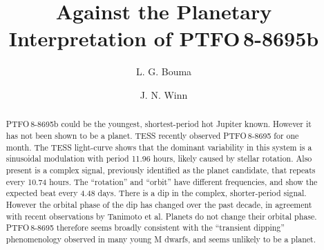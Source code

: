 \documentclass[12pt,twocolumn,tighten]{aastex62}
\begin{document}

\title{Against the Planetary Interpretation of PTFO$\,$8-8695b}


%
%
\author[0000-0002-0514-5538]{L. G. Bouma}
%
\author[0000-0002-4265-047X]{J. N. Winn}

%
%

\begin{abstract}
  PTFO$\,$8-8695b could be the youngest, shortest-period 
  hot Jupiter known.  However it has not been shown to be a planet.
  TESS recently observed PTFO$\,$8-8695 for one month.
  The TESS light-curve shows that the dominant variability in this
  system is a sinusoidal modulation with period 11.96 hours, likely
  caused by stellar rotation.
  Also present is a complex signal, previously identified as the
  planet candidate, that repeats every 10.74 hours.
  The ``rotation'' and ``orbit'' have different frequencies,
  and show the expected beat every 4.48 days.
  There is a dip in the complex, shorter-period signal.
  However the orbital phase of the dip has changed over the past
  decade, in agreement with recent observations by Tanimoto et al.
  Planets do not change their orbital phase.
  PTFO$\,$8-8695 therefore seems broadly consistent with the
  ``transient dipping'' phenomenology observed in many young M dwarfs,
  and seems unlikely to be a planet.
\end{abstract}
\end{document}
